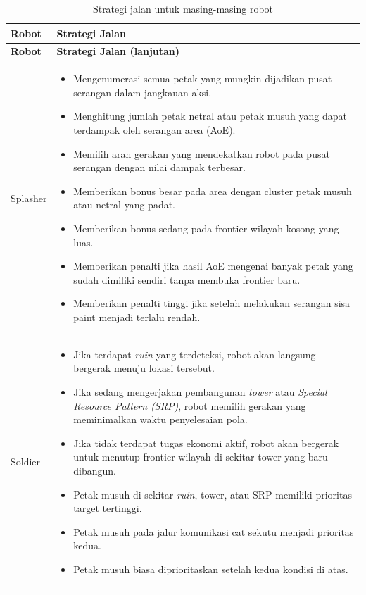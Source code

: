 \documentclass{article}
\begin{document}
\begin{longtable}{|p{}|p{}|}\caption{Strategi jalan untuk masing-masing robot} \\

\hline
\textbf{Robot} & \textbf{Strategi Jalan} \\
\hline
\endfirsthead

\hline
\textbf{Robot} & \textbf{Strategi Jalan (lanjutan)} \\
\hline
\endhead

Splasher &
\begin{itemize}[leftmargin=*, nosep]
    \item Mengenumerasi semua petak yang mungkin dijadikan pusat serangan dalam jangkauan aksi.
    \item Menghitung jumlah petak netral atau petak musuh yang dapat terdampak oleh serangan area (AoE).
    \item Memilih arah gerakan yang mendekatkan robot pada pusat serangan dengan nilai dampak terbesar.
    \item Memberikan bonus besar pada area dengan cluster petak musuh atau netral yang padat.
    \item Memberikan bonus sedang pada frontier wilayah kosong yang luas.
    \item Memberikan penalti jika hasil AoE mengenai banyak petak yang sudah dimiliki sendiri tanpa membuka frontier baru.
    \item Memberikan penalti tinggi jika setelah melakukan serangan sisa paint menjadi terlalu rendah.
    \end{itemize}
    \\
    \hline

Soldier &
\begin{itemize}[leftmargin=*, nosep]
    \item Jika terdapat \textit{ruin} yang terdeteksi, robot akan langsung bergerak menuju lokasi tersebut.
    \item Jika sedang mengerjakan pembangunan \textit{tower} atau \textit{Special Resource Pattern (SRP)}, robot memilih gerakan yang meminimalkan waktu penyelesaian pola.
    \item Jika tidak terdapat tugas ekonomi aktif, robot akan bergerak untuk menutup frontier wilayah di sekitar tower yang baru dibangun.
    \item Petak musuh di sekitar \textit{ruin}, tower, atau SRP memiliki prioritas target tertinggi.
    \item Petak musuh pada jalur komunikasi cat sekutu menjadi prioritas kedua.
    \item Petak musuh biasa diprioritaskan setelah kedua kondisi di atas.
    \end{itemize}
    \\
    \hline


\end{longtable}
\end{document}
